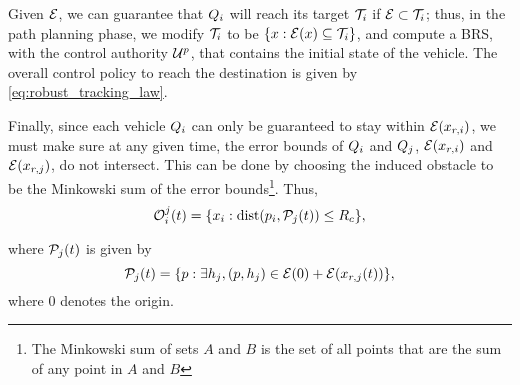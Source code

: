 Given $\mathcal{E}$, we can guarantee that $Q_i$ will reach its target $\mathcal{T}_i$ if $\mathcal{E} \subset \mathcal{T}_i$; thus, in the path planning phase, we modify $\mathcal{T}_i$ to be $\{x: \mathcal{E}(x) \subseteq \mathcal{T}_i\}$, and compute a BRS, with the control authority $\mathcal{U}^p$, that contains the initial state of the vehicle. The overall control policy to reach the destination is given by \ref{eq:robust_tracking_law}.

Finally, since each vehicle $Q_i$ can only be guaranteed to stay within $\mathcal{E}(x_{r,i})$, we must make sure at any given time, the error bounds of $Q_i$ and $Q_j$, $\mathcal{E}(x_{r,i})$ and $\mathcal{E}(x_{r,j})$, do not intersect. This can be done by choosing the induced obstacle to be the Minkowski sum of the error bounds\footnote{The Minkowski sum of sets $A$ and $B$ is the set of all points that are the sum of any point in $A$ and $B$}. Thus,
\vspace{-0.3em}
\begin{equation}
\mathcal{O}_i^j(t) = \{x_i: \text{dist}(p_i, \mathcal{P}_j(t)) \le R_c \},
\end{equation}

\noindent where $\mathcal{P}_j(t)$ is given by
\vspace{-0.4em}
\begin{equation}
\mathcal{P}_j(t) = \{p: \exists h_j, (p, h_j) \in \mathcal{E}(0) + \mathcal{E}(x_{r,j}(t)) \},
\end{equation}
\noindent where $0$ denotes the origin. 


